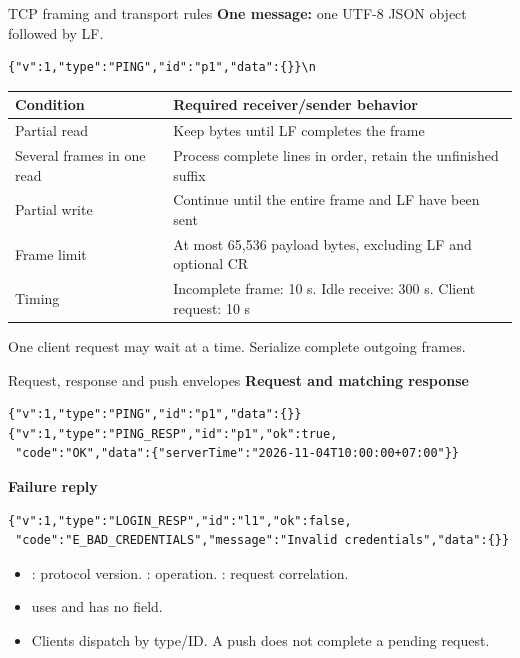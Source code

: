 \documentclass[t,aspectratio=169]{beamer}
\newcommand{\msg}[1]{\texttt{\detokenize{#1}}}
\newcommand{\lead}[1]{\textcolor{hustprimary}{\textbf{#1}}}
\newcommand{\gap}{\par\vspace{0.18cm}}
\newenvironment{points}{\begin{itemize}\setlength{\itemsep}{6pt}}{\end{itemize}}
\begin{document}
\begin{frame}[fragile]{TCP framing and transport rules}
\small
\textbf{One message:} one UTF-8 JSON object followed by LF.
\begin{lstlisting}
{"v":1,"type":"PING","id":"p1","data":{}}\n
\end{lstlisting}
\begin{tabularx}{\textwidth}{@{}lY@{}}
\toprule
\textbf{Condition} & \textbf{Required receiver/sender behavior}\\
\midrule
Partial read & Keep bytes until LF completes the frame\\
Several frames in one read & Process complete lines in order, retain the unfinished suffix\\
Partial write & Continue until the entire frame and LF have been sent\\
Frame limit & At most 65,536 payload bytes, excluding LF and optional CR\\
Timing & Incomplete frame: 10 s. Idle receive: 300 s. Client request: 10 s\\
\bottomrule
\end{tabularx}
\gap
One client request may wait at a time. Serialize complete outgoing frames.
\end{frame}

\begin{frame}[fragile]{Request, response and push envelopes}
\small
\lead{Request and matching response}
\begin{lstlisting}
{"v":1,"type":"PING","id":"p1","data":{}}
{"v":1,"type":"PING_RESP","id":"p1","ok":true,
 "code":"OK","data":{"serverTime":"2026-11-04T10:00:00+07:00"}}
\end{lstlisting}
\lead{Failure reply}
\begin{lstlisting}
{"v":1,"type":"LOGIN_RESP","id":"l1","ok":false,
 "code":"E_BAD_CREDENTIALS","message":"Invalid credentials","data":{}}
\end{lstlisting}
\begin{points}
\item \msg{v}: protocol version. \msg{type}: operation. \msg{id}: request correlation.
\item \msg{NOTIFY} uses \msg{id:null} and has no \msg{ok} field.
\item Clients dispatch by type/ID. A push does not complete a pending request.
\end{points}
\end{frame}
\end{document}
